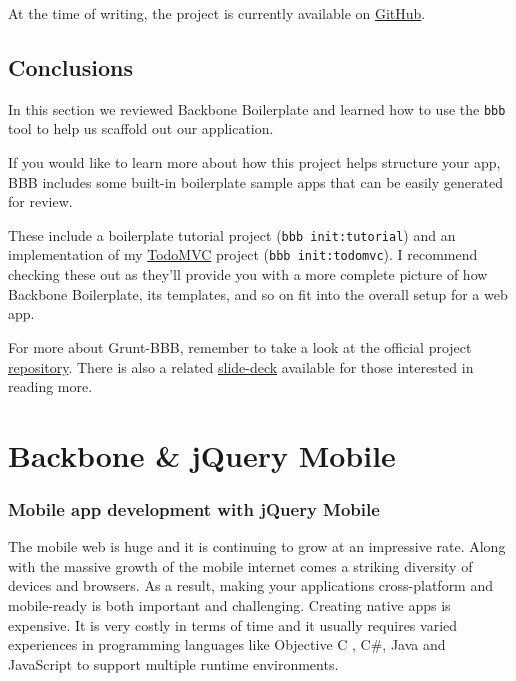 \documentclass[9pt]{book}
\begin{document}
At the time of writing, the project is currently available on
\href{https://github.com/spect88/backbone-devtools}{GitHub}.

\subsection{Conclusions}\label{conclusions-1}

In this section we reviewed Backbone Boilerplate and learned how to use
the \texttt{bbb} tool to help us scaffold out our application.

If you would like to learn more about how this project helps structure
your app, BBB includes some built-in boilerplate sample apps that can be
easily generated for review.

These include a boilerplate tutorial project
(\texttt{bbb init:tutorial}) and an implementation of my
\href{http://todomvc}{TodoMVC} project (\texttt{bbb init:todomvc}). I
recommend checking these out as they'll provide you with a more complete
picture of how Backbone Boilerplate, its templates, and so on fit into
the overall setup for a web app.

For more about Grunt-BBB, remember to take a look at the official
project
\href{https://github.com/backbone-boilerplate/grunt-bbb}{repository}.
There is also a related
\href{https://dl.dropbox.com/u/79007/talks/Modern_Web_Applications/slides/index.html}{slide-deck}
available for those interested in reading more.

\section{Backbone \& jQuery Mobile}\label{backbone-jquery-mobile}

\subsubsection{Mobile app development with jQuery
Mobile}\label{mobile-app-development-with-jquery-mobile}

The mobile web is huge and it is continuing to grow at an impressive
rate. Along with the massive growth of the mobile internet comes a
striking diversity of devices and browsers. As a result, making your
applications cross-platform and mobile-ready is both important and
challenging. Creating native apps is expensive. It is very costly in
terms of time and it usually requires varied experiences in programming
languages like Objective C , C\#, Java and JavaScript to support
multiple runtime environments.
\end{document}
